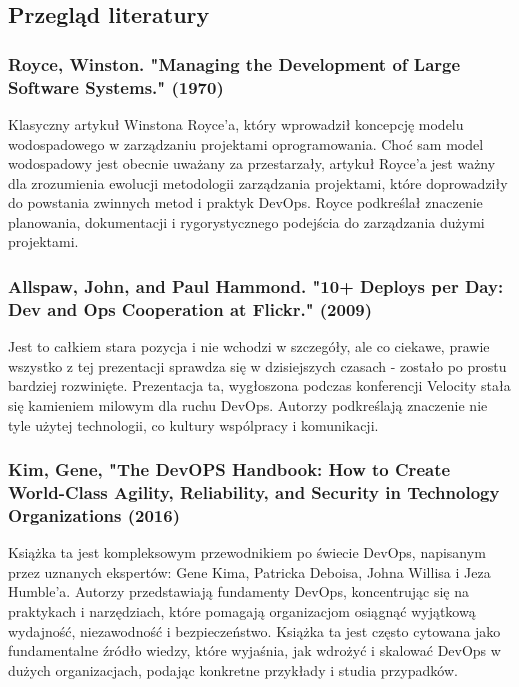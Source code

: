 \documentclass{article}
\begin{document}
\subsection{Przegląd literatury}

\subsubsection{Royce, Winston. "Managing the Development of Large Software Systems." (1970)\cite{royceWaterfall}} 

Klasyczny artykuł Winstona Royce'a, który wprowadził koncepcję modelu wodospadowego w zarządzaniu projektami oprogramowania. Choć sam model wodospadowy jest obecnie uważany za przestarzały, artykuł Royce'a jest ważny dla zrozumienia ewolucji metodologii zarządzania projektami, które doprowadziły do powstania zwinnych metod i praktyk DevOps. Royce podkreślał znaczenie planowania, dokumentacji i rygorystycznego podejścia do zarządzania dużymi projektami.

\subsubsection{Allspaw, John, and Paul Hammond. "10+ Deploys per Day: Dev and Ops Cooperation at Flickr." (2009)\cite{flickr}}
Jest to całkiem stara pozycja i nie wchodzi w szczegóły, ale co ciekawe, prawie wszystko z tej prezentacji sprawdza się w dzisiejszych czasach - zostało po prostu bardziej rozwinięte. Prezentacja ta, wygłoszona podczas konferencji Velocity stała się kamieniem milowym dla ruchu DevOps. Autorzy podkreślają znaczenie nie tyle użytej technologii, co kultury wspólpracy i komunikacji. 

\subsubsection{Kim, Gene, "The DevOPS Handbook: How to Create World-Class Agility, Reliability, and Security in Technology Organizations (2016)\cite{devOpsHandbook}}
Książka ta jest kompleksowym przewodnikiem po świecie DevOps, napisanym przez uznanych ekspertów: Gene Kima, Patricka Deboisa, Johna Willisa i Jeza Humble'a. Autorzy przedstawiają fundamenty DevOps, koncentrując się na praktykach i narzędziach, które pomagają organizacjom osiągnąć wyjątkową wydajność, niezawodność i bezpieczeństwo. Książka ta jest często cytowana jako fundamentalne źródło wiedzy, które wyjaśnia, jak wdrożyć i skalować DevOps w dużych organizacjach, podając konkretne przykłady i studia przypadków.
\end{document}
